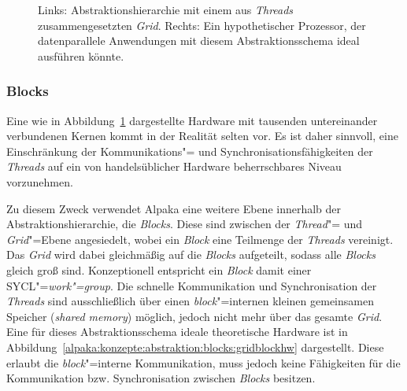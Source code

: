 \begin{figure}
    \caption[Abstraktionshierarchie aus Grid und Threads]
            {Links: Abstraktionshierarchie mit einem aus \textit{Threads}
             zusammengesetzten \textit{Grid}. Rechts: Ein hypothetischer
             Prozessor, der datenparallele Anwendungen mit diesem
             Abstraktionsschema ideal ausführen könnte.
             \cite[nach][18]{worpitz2015}}
    \label{alpaka:konzepte:abstraktion:threads:gridthreadhw}
\end{figure}

\subsubsection{Blocks}

Eine wie in Abbildung~\ref{alpaka:konzepte:abstraktion:threads:gridthreadhw}
dargestellte Hardware mit tausenden untereinander verbundenen Kernen kommt
in der Realität selten vor. Es ist daher sinnvoll, eine Einschränkung der
Kommunikations"= und Synchronisationsfähigkeiten der \textit{Threads} auf ein
von handelsüblicher Hardware beherrschbares Niveau vorzunehmen.

Zu diesem Zweck verwendet Alpaka eine weitere Ebene innerhalb der
Abstraktionshierarchie, die \textit{Blocks}. Diese sind zwischen der
\textit{Thread}"= und \textit{Grid}"=Ebene angesiedelt, wobei ein \textit{Block}
eine Teilmenge der \textit{Threads} vereinigt. Das \textit{Grid} wird dabei
gleichmäßig auf die \textit{Blocks} aufgeteilt, sodass alle \textit{Blocks}
gleich groß sind. Konzeptionell entspricht ein \textit{Block} damit einer
SYCL"=\textit{work"=group}. Die schnelle Kommunikation und Synchronisation der
\textit{Threads} sind ausschließlich über einen \textit{block}"=internen kleinen
gemeinsamen Speicher (\textit{shared memory}) möglich, jedoch nicht mehr über
das gesamte \textit{Grid}. Eine für dieses Abstraktionsschema ideale
theoretische Hardware ist in
Abbildung~\ref{alpaka:konzepte:abstraktion:blocks:gridblockhw} dargestellt.
Diese erlaubt die \textit{block}"=interne Kommunikation, muss jedoch keine
Fähigkeiten für die Kommunikation bzw. Synchronisation zwischen \textit{Blocks}
besitzen.

